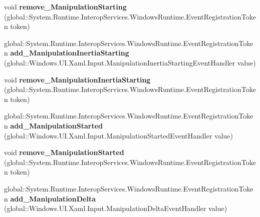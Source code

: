 \begin{DoxyCompactItemize}
void {\bfseries remove\+\_\+\+Manipulation\+Starting} (global\+::\+System.\+Runtime.\+Interop\+Services.\+Windows\+Runtime.\+Event\+Registration\+Token token)
\item 
\mbox{\label{interface_windows_1_1_u_i_1_1_xaml_1_1_i_u_i_element_a8b3a684ee7f64d2a3b27633301a58825}} 
global\+::\+System.\+Runtime.\+Interop\+Services.\+Windows\+Runtime.\+Event\+Registration\+Token {\bfseries add\+\_\+\+Manipulation\+Inertia\+Starting} (global\+::\+Windows.\+U\+I.\+Xaml.\+Input.\+Manipulation\+Inertia\+Starting\+Event\+Handler value)
\item 
\mbox{\label{interface_windows_1_1_u_i_1_1_xaml_1_1_i_u_i_element_a45e976afe0af013e41228cbdbdf558d2}} 
void {\bfseries remove\+\_\+\+Manipulation\+Inertia\+Starting} (global\+::\+System.\+Runtime.\+Interop\+Services.\+Windows\+Runtime.\+Event\+Registration\+Token token)
\item 
\mbox{\label{interface_windows_1_1_u_i_1_1_xaml_1_1_i_u_i_element_a0a6629935ddc66f152be79ea1665fe62}} 
global\+::\+System.\+Runtime.\+Interop\+Services.\+Windows\+Runtime.\+Event\+Registration\+Token {\bfseries add\+\_\+\+Manipulation\+Started} (global\+::\+Windows.\+U\+I.\+Xaml.\+Input.\+Manipulation\+Started\+Event\+Handler value)
\item 
\mbox{\label{interface_windows_1_1_u_i_1_1_xaml_1_1_i_u_i_element_a474a76e685a8b1af9722e5560b7d4c12}} 
void {\bfseries remove\+\_\+\+Manipulation\+Started} (global\+::\+System.\+Runtime.\+Interop\+Services.\+Windows\+Runtime.\+Event\+Registration\+Token token)
\item 
\mbox{\label{interface_windows_1_1_u_i_1_1_xaml_1_1_i_u_i_element_a478e7f65d80dfe362a865349005a2475}} 
global\+::\+System.\+Runtime.\+Interop\+Services.\+Windows\+Runtime.\+Event\+Registration\+Token {\bfseries add\+\_\+\+Manipulation\+Delta} (global\+::\+Windows.\+U\+I.\+Xaml.\+Input.\+Manipulation\+Delta\+Event\+Handler value)
\item 
\mbox{\label{interface_windows_1_1_u_i_1_1_xaml_1_1_i_u_i_element_a6abde84051b66829e30ea77484453f4f}} 

\end{DoxyCompactItemize}
